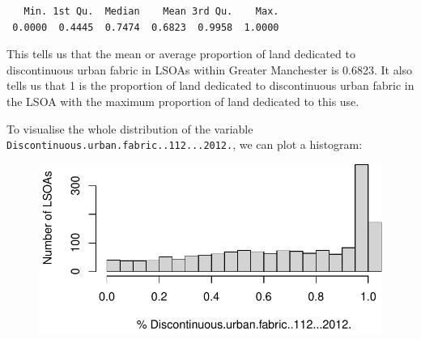 \documentclass[
  letterpaper,
  DIV=11,
  numbers=noendperiod]{scrreprt}
\newenvironment{Shaded}{\begin{snugshade}}{\end{snugshade}}
\newcommand{\AttributeTok}[1]{\textcolor[rgb]{0.40,0.45,0.13}{#1}}
\newcommand{\ConstantTok}[1]{\textcolor[rgb]{0.56,0.35,0.01}{#1}}
\newcommand{\DecValTok}[1]{\textcolor[rgb]{0.68,0.00,0.00}{#1}}
\newcommand{\FloatTok}[1]{\textcolor[rgb]{0.68,0.00,0.00}{#1}}
\newcommand{\FunctionTok}[1]{\textcolor[rgb]{0.28,0.35,0.67}{#1}}
\newcommand{\NormalTok}[1]{\textcolor[rgb]{0.00,0.23,0.31}{#1}}
\newcommand{\SpecialCharTok}[1]{\textcolor[rgb]{0.37,0.37,0.37}{#1}}
\newcommand{\StringTok}[1]{\textcolor[rgb]{0.13,0.47,0.30}{#1}}
\begin{document}
\begin{Shaded}
\end{Shaded}

\begin{verbatim}
   Min. 1st Qu.  Median    Mean 3rd Qu.    Max. 
 0.0000  0.4445  0.7474  0.6823  0.9958  1.0000 
\end{verbatim}

This tells us that the mean or average proportion of land dedicated to
discontinuous urban fabric in LSOAs within Greater Manchester is 0.6823.
It also tells us that 1 is the proportion of land dedicated to
discontinuous urban fabric in the LSOA with the maximum proportion of
land dedicated to this use.

To visualise the whole distribution of the variable
\texttt{Discontinuous.urban.fabric..112...2012.}, we can plot a
histogram:

\begin{Shaded}
\end{Shaded}

\begin{figure}[H]

{\centering \includegraphics{geodemographics_files/figure-pdf/unnamed-chunk-8-1.pdf}

}

\end{figure}
\end{document}
